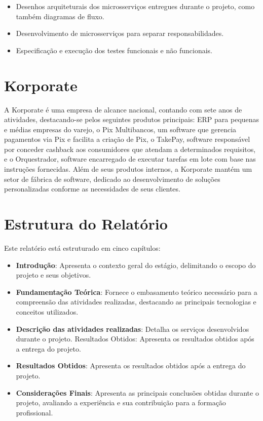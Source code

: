 \begin{itemize}

    \item Desenhos arquiteturais dos microsserviços entregues durante o projeto, como 
    também diagramas de fluxo.
    \item Desenvolvimento de microsserviços para separar responsabilidades. 
    \item Especificação e execução dos testes funcionais e não funcionais. 

\end{itemize}

\section{Korporate}

A Korporate é uma empresa de alcance nacional, contando com sete anos de atividades, 
destacando-se pelos seguintes produtos principais: ERP para pequenas e médias 
empresas do varejo, o Pix Multibancos, um software que gerencia pagamentos via Pix 
e facilita a criação de Pix, o TakePay, software responsável por conceder cashback 
aos consumidores que atendam a determinados requisitos, e o Orquestrador, software 
encarregado de executar tarefas em lote com base nas instruções fornecidas. Além de seus 
produtos internos, a Korporate mantém um setor de fábrica de software, dedicado ao 
desenvolvimento de soluções personalizadas conforme as necessidades de seus 
clientes.

\section{Estrutura do Relatório}

Este relatório está estruturado em cinco capítulos:

\begin{itemize}

\item \textbf{Introdução}: Apresenta o contexto geral do estágio, delimitando o 
escopo do projeto e seus objetivos. 

\item \textbf{Fundamentação Teórica}: Fornece o embasamento teórico necessário para a 
compreensão das atividades realizadas, destacando as principais tecnologias e 
conceitos utilizados. 

\item \textbf{Descrição das atividades realizadas}: Detalha os serviços 
desenvolvidos durante o projeto. Resultados Obtidos: Apresenta os resultados 
obtidos após a entrega do projeto.	

\item \textbf{Resultados Obtidos}: Apresenta os resultados obtidos após a entrega do projeto.

\item \textbf{Considerações Finais}: Apresenta as principais conclusões obtidas 
durante o projeto, avaliando a experiência e sua contribuição para a formação 
profissional.

\end{itemize}